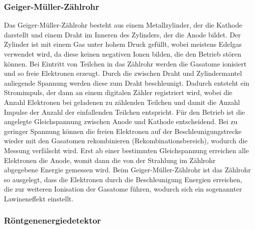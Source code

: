 \documentclass[11pt, a4paper]{article}
\begin{document}
\subsubsection{Geiger-Müller-Zählrohr}
Das Geiger-Müller-Zählrohr besteht aus einem Metallzylinder, der die Kathode darstellt und einem Draht im Inneren des Zylinders, der die Anode bildet.
Der Zylinder ist mit einem Gas unter hohem Druck gefüllt, wobei meistens Edelgas verwendet wird, da diese keinen negativen Ionen bilden, die den Betrieb stören können.
Bei Eintritt von Teilchen in das Zählrohr werden die Gasatome ionisiert und so freie Elektronen erzeugt.
Durch die zwischen Draht und Zylindermantel anliegende Spannung werden diese zum Draht beschleunigt.
Dadurch entsteht ein Stromimpuls, der dann an einem digitalen Zähler registriert wird, wobei die Anzahl Elektronen bei geladenen zu zählenden Teilchen und damit die Anzahl Impulse der Anzahl der einfallenden Teilchen entspricht.
Für den Betrieb ist die angelegte Gleichspannung zwischen Anode und Kathode entscheidend.
Bei zu geringer Spannung können die freien Elektronen auf der Beschleunigungstrecke wieder mit den Gasatomen rekombinieren (Rekombinationsbereich), wodurch die Messung verfälscht wird.
Erst ab einer bestimmten Gleichspannung erreichen alle Elektronen die Anode, womit dann die von der Strahlung im Zählrohr abgegebene Energie gemessen wird.
Beim Geiger-Müller-Zählrohr ist das Zählrohr so ausgelegt, dass die Elektronen durch die Beschleunigung Energien erreichen, die zur weiteren Ionisation der Gasatome führen, wodurch sich ein sogenannter Lawineneffekt einstellt.

\subsubsection{Röntgenenergiedetektor}
\label{sec:energiedetektor}
\end{document}
